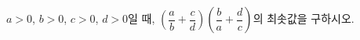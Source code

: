 $a>0$, $b>0$, $c>0$, $d>0$일 때, $\left(\dfrac{a}{b}+\dfrac{c}{d}\right)\left(\dfrac{b}{a}+\dfrac{d}{c}\right)$의 최솟값을 구하시오.
